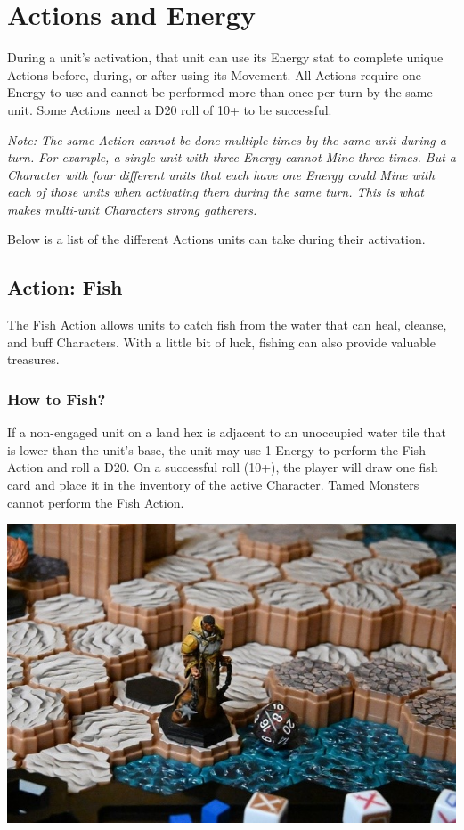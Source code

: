 \documentclass[../main.tex]{subfiles}
\begin{document}
\section{Actions and Energy}

During a unit’s activation, that unit can use its Energy stat to complete unique Actions before, during, or after using its Movement. All Actions require one Energy to use and cannot be performed more than once per turn by the same unit. Some Actions need a D20 roll of 10+ to be successful.

\textit{Note: The same Action cannot be done multiple times by the same unit during a turn. For example, a single unit with three Energy cannot Mine three times. But a Character with four different units that each have one Energy could Mine with each of those units when activating them during the same turn. This is what makes multi-unit Characters strong gatherers.}

Below is a list of the different Actions units can take during their activation.

\subsection{Action: Fish}
The Fish Action allows units to catch fish from the water that can heal, cleanse, and buff Characters. With a little bit of luck, fishing can also provide valuable treasures.

\subsubsection{How to Fish? }
If a non-engaged unit on a land hex is adjacent to an unoccupied water tile that is lower than the unit’s base, the unit may use 1 Energy to perform the Fish Action and roll a D20. On a successful roll (10+), the player will draw one fish card and place it in the inventory of the active Character. Tamed Monsters cannot perform the Fish Action.

\centering
    \includegraphics[width=1\linewidth]{chapters//ActionsandEnergy/TimeStrikeCharFishing.jpg}  
\end{document}
